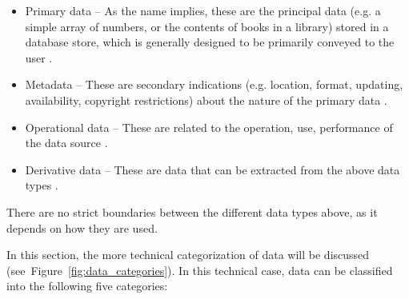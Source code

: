 				\begin{itemize}
					\item Primary data -- As the name implies,  these are the principal data (e.g. a simple array of numbers, or the contents of books in a library) stored in a database store, which is generally designed to be primarily conveyed to the user \cite{Floridi1999}.
					\item Metadata -- These are secondary indications (e.g. location, format, updating, availability, copyright restrictions) about the nature of the primary data \cite{Floridi1999}.
					\item Operational data -- These are related to the operation, use, performance of the data source \cite{Floridi1999}.
					\item Derivative data -- These are data that can be extracted from the above data types \cite{Floridi1999}.
				\end{itemize}
				
				There are no strict boundaries between the different data types above, as it depends on how they are used.	

				In this section, the more technical categorization of data will be discussed (see~Figure~\ref{fig:data_categories}). In this technical case, data can be classified into the following five categories:
							
				
